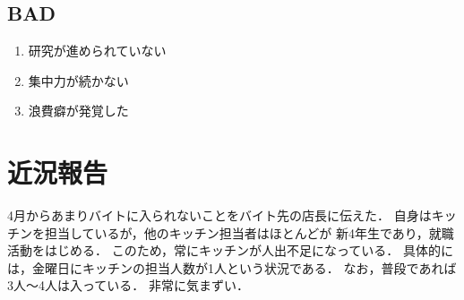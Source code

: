 \documentclass[fleqn, 12pt]{extarticlej}
\begin{document}
  \subsection{BAD}
  \begin{enumerate}
   \item 研究が進められていない
   \item 集中力が続かない
   \item 浪費癖が発覚した
  \end{enumerate}

\section{近況報告}
4月からあまりバイトに入られないことをバイト先の店長に伝えた．
自身はキッチンを担当しているが，他のキッチン担当者はほとんどが
新4年生であり，就職活動をはじめる．
このため，常にキッチンが人出不足になっている．
具体的には，金曜日にキッチンの担当人数が1人という状況である．
なお，普段であれば3人〜4人は入っている．
非常に気まずい．
\end{document}
